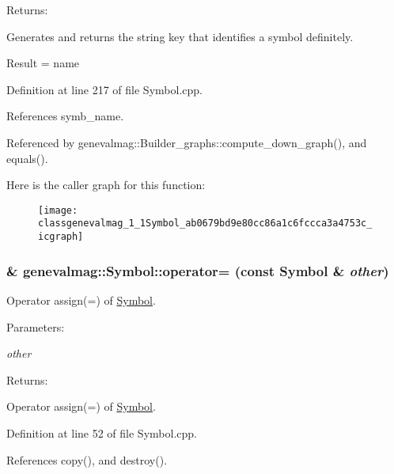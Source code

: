 \begin{Desc}
\item[Returns:]\end{Desc}
Generates and returns the string key that identifies a symbol definitely.

Result = name 

Definition at line 217 of file Symbol.cpp.

References symb\_\-name.

Referenced by genevalmag::Builder\_\-graphs::compute\_\-down\_\-graph(), and equals().

Here is the caller graph for this function:\nopagebreak
\begin{figure}[H]
\begin{center}
\leavevmode
\texttt{[image: classgenevalmag\_1\_1Symbol\_ab0679bd9e80cc86a1c6fccca3a4753c\_icgraph]}
\end{center}
\end{figure}
\hypertarget{classgenevalmag_1_1Symbol_4f51c5b39b2a272210fc7a15d07bdd4e}{
\subsubsection[{operator=}]{ \& genevalmag::Symbol::operator= (const {\bf Symbol} \& {\em other})}}
\label{classgenevalmag_1_1Symbol_4f51c5b39b2a272210fc7a15d07bdd4e}


Operator assign(=) of \hyperlink{classgenevalmag_1_1Symbol}{Symbol}. \begin{Desc}
\item[Parameters:]
\begin{description}
\item[{\em other}]\end{description}
\end{Desc}
\begin{Desc}
\item[Returns:]\end{Desc}
Operator assign(=) of \hyperlink{classgenevalmag_1_1Symbol}{Symbol}. 

Definition at line 52 of file Symbol.cpp.

References copy(), and destroy().

